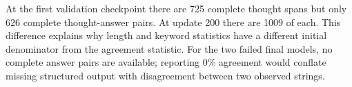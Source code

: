 \documentclass[10pt,twocolumn,letterpaper]{article}
\begin{document}
At the first validation checkpoint there are 725 complete thought spans but only 626 complete thought-answer pairs. At update 200 there are 1009 of each. This difference explains why length and keyword statistics have a different initial denominator from the agreement statistic. For the two failed final models, no complete answer pairs are available; reporting 0\% agreement would conflate missing structured output with disagreement between two observed strings.
\end{document}
